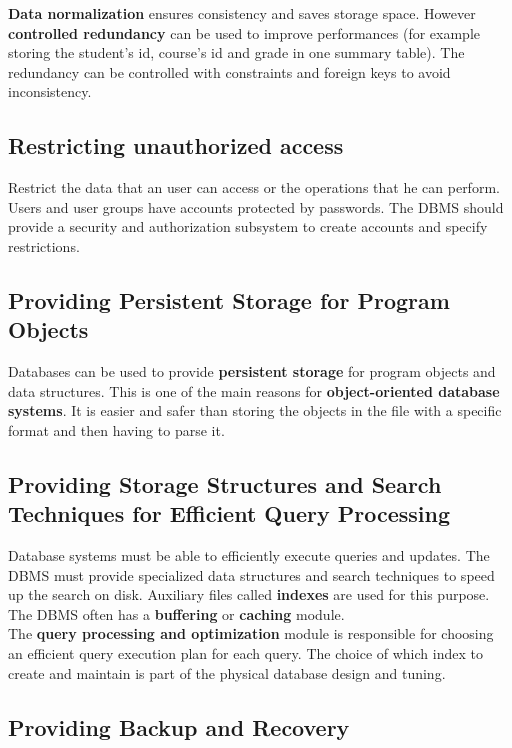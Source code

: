 \textbf{Data normalization} ensures consistency and saves storage space. However \textbf{controlled redundancy} can be used to improve performances (for example storing the student's id, course's id and grade in one summary table). The redundancy can be controlled with constraints and foreign keys to avoid inconsistency.

\subsection{Restricting unauthorized access}

Restrict the data that an user can access or the operations that he can perform. Users and user groups have accounts protected by passwords. The DBMS should provide a security and authorization subsystem to create accounts and specify restrictions. 

\subsection{Providing Persistent Storage for Program Objects}

Databases can be used to provide \textbf{persistent storage} for program objects and data structures. This is one of the main reasons for \textbf{object-oriented database systems}. It is easier and safer than storing the objects in the file with a specific format and then having to parse it.

\subsection{Providing Storage Structures and Search Techniques for Efficient Query Processing}

Database systems must be able to efficiently execute queries and updates. The DBMS must provide specialized data structures and search techniques to speed up the search on disk. Auxiliary files called \textbf{indexes} are used for this purpose. The DBMS often has a \textbf{buffering} or \textbf{caching} module.\\

The \textbf{query processing and optimization} module is responsible for choosing an efficient query execution plan for each query. The choice of which index to create and maintain is part of the physical database design and tuning.

\subsection{Providing Backup and Recovery}

